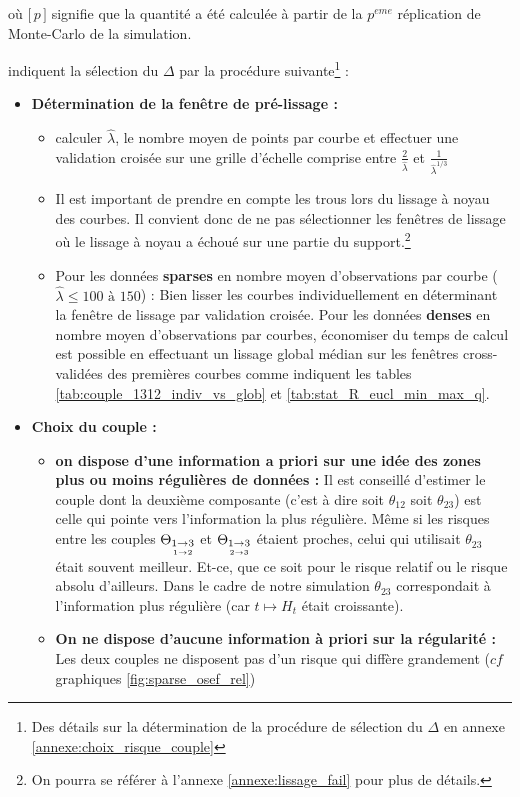 \smallskip
où $\bigl[\, p \,\bigr]$ signifie que la quantité a été calculée à partir de la $p^{eme}$ réplication de Monte-Carlo de la simulation.

\bigskip

indiquent la sélection du $\Delta$ par la procédure suivante\footnote{Des détails sur la détermination de la procédure de sélection du $\Delta$ en annexe \ref{annexe:choix_risque_couple}} :

\begin{itemize}
	\item \textbf{Détermination de la fenêtre de pré-lissage :}
	\begin{itemize}
		
		\item calculer $\widehat \lambda$, le nombre moyen de points par courbe et effectuer une validation croisée sur une grille d'échelle comprise entre $\displaystyle\frac{2}{\widehat \lambda}$ et $\displaystyle\frac{1}{\widehat \lambda^{1/3}}$

		\item Il est important de prendre en compte les \og trous \fg lors du lissage à noyau des courbes. Il convient donc de ne pas sélectionner les fenêtres de lissage où le lissage à noyau a échoué sur une partie du support.\footnote{On pourra se référer à l'annexe \ref{annexe:lissage_fail} pour plus de détails.}

		\item Pour les données \textbf{\og sparses \fg} en nombre moyen d'observations par courbe ($\widehat \lambda \leq  100 \textsf{ à } 150$) : Bien lisser les courbes individuellement en déterminant la fenêtre de lissage par validation croisée. Pour les données \textbf{\og denses \fg} en nombre moyen d'observations par courbes, économiser du temps de calcul est possible en effectuant un lissage global médian sur les fenêtres cross-validées des premières courbes comme indiquent les tables \ref{tab:couple_1312_indiv_vs_glob} et \ref{tab:stat_R_eucl_min_max_q}.
	\end{itemize}


	\bigskip

	\item \textbf{Choix du couple :}

	\begin{itemize}
		\item \textbf{on dispose d'une information a priori sur une idée des zones plus ou moins régulières de données :} Il est conseillé d'estimer le couple dont la deuxième composante (c'est à dire soit $\theta_{12}$ soit $\theta_{23}$) est celle qui pointe vers l'information la plus régulière. Même si les risques entre les couples $\Theta_{\underset{1 \rightarrow 2}{1 \rightarrow 3}}$ et $\Theta_{\underset{2 \rightarrow 3}{1 \rightarrow 3}}$ étaient proches, celui qui utilisait $\theta_{23}$ était souvent meilleur. Et-ce, que ce soit pour le risque relatif ou le risque absolu d'ailleurs. Dans le cadre de notre simulation $\theta_{23}$ correspondait à l'information plus régulière (car $t \mapsto H_t$ était croissante).
		\item \textbf{On ne dispose d'aucune information à priori sur la régularité :} Les deux couples ne disposent pas d'un risque qui diffère grandement ($cf$ graphiques \ref{fig:sparse_osef_rel})
	\end{itemize}


\end{itemize}
